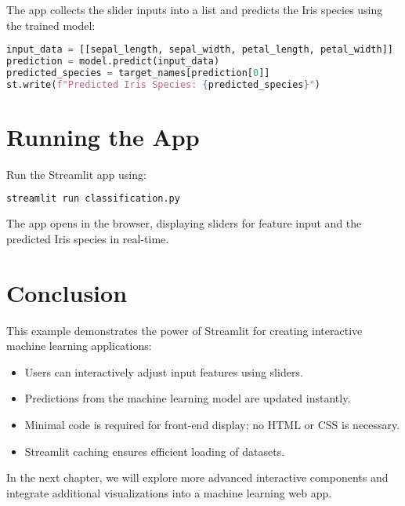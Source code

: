 The app collects the slider inputs into a list and predicts the Iris species using the trained model:

\begin{lstlisting}[language=Python]
input_data = [[sepal_length, sepal_width, petal_length, petal_width]]
prediction = model.predict(input_data)
predicted_species = target_names[prediction[0]]
st.write(f"Predicted Iris Species: {predicted_species}")
\end{lstlisting}

\section{Running the App}

Run the Streamlit app using:

\begin{lstlisting}[language=bash]
streamlit run classification.py
\end{lstlisting}

The app opens in the browser, displaying sliders for feature input and the predicted Iris species in real-time.

\section{Conclusion}

This example demonstrates the power of Streamlit for creating interactive machine learning applications:

\begin{itemize}
    \item Users can interactively adjust input features using sliders.
    \item Predictions from the machine learning model are updated instantly.
    \item Minimal code is required for front-end display; no HTML or CSS is necessary.
    \item Streamlit caching ensures efficient loading of datasets.
\end{itemize}

In the next chapter, we will explore more advanced interactive components and integrate additional visualizations into a machine learning web app.
